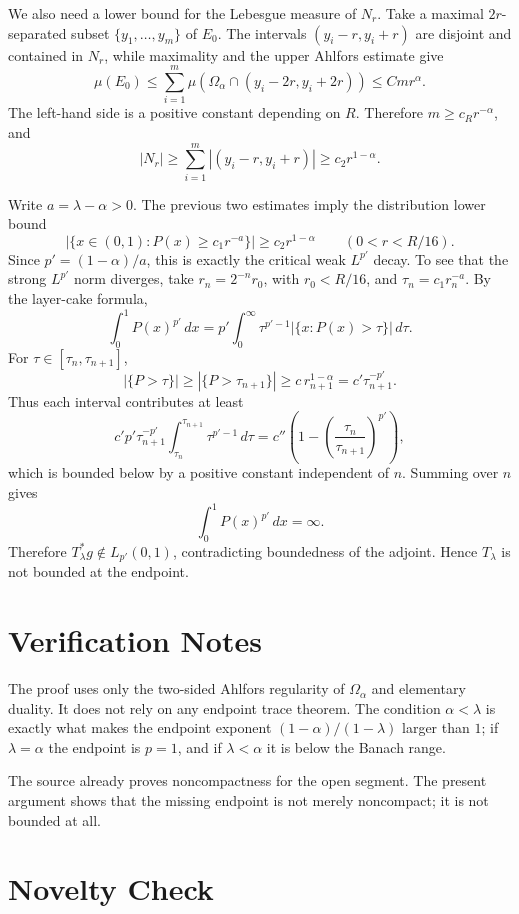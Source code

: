\documentclass[11pt]{article}
\begin{document}
We also need a lower bound for the Lebesgue measure of \(N_r\). Take a maximal
\(2r\)-separated subset \(\{y_1,\dots,y_m\}\) of
\(E_0\). The intervals
\((y_i-r,y_i+r)\) are disjoint and contained in \(N_r\), while maximality and
the upper Ahlfors estimate give
\[
  \mu(E_0)
  \le \sum_{i=1}^m \mu(\Omega_\alpha\cap(y_i-2r,y_i+2r))
  \le C m r^\alpha .
\]
The left-hand side is a positive constant depending on \(R\). Therefore
\(m\ge c_R r^{-\alpha}\), and
\[
  |N_r|\ge \sum_{i=1}^m |(y_i-r,y_i+r)|
  \ge c_2 r^{1-\alpha}.
\]

Write \(a=\lambda-\alpha>0\). The previous two estimates imply the distribution
lower bound
\[
  \big|\{x\in(0,1):P(x)\ge c_1 r^{-a}\}\big|
  \ge c_2 r^{1-\alpha}
  \qquad (0<r<R/16).
\]
Since \(p'=(1-\alpha)/a\), this is exactly the critical weak \(L^{p'}\) decay.
To see that the strong \(L^{p'}\) norm diverges, take \(r_n=2^{-n}r_0\), with
\(r_0<R/16\), and \(\tau_n=c_1 r_n^{-a}\). By the layer-cake formula,
\[
  \int_0^1 P(x)^{p'}\,dx
  =
  p'\int_0^\infty \tau^{p'-1}
  |\{x:P(x)>\tau\}|\,d\tau .
\]
For \(\tau\in[\tau_n,\tau_{n+1}]\),
\[
  |\{P>\tau\}|\ge |\{P>\tau_{n+1}\}|
  \ge c\,r_{n+1}^{1-\alpha}
  = c'\tau_{n+1}^{-p'}.
\]
Thus each interval contributes at least
\[
  c'p'\tau_{n+1}^{-p'}\int_{\tau_n}^{\tau_{n+1}}\tau^{p'-1}\,d\tau
  =
  c''\left(1-\left(\frac{\tau_n}{\tau_{n+1}}\right)^{p'}\right),
\]
which is bounded below by a positive constant independent of \(n\). Summing over
\(n\) gives
\[
  \int_0^1 P(x)^{p'}\,dx=\infty.
\]
Therefore \(T_\lambda^*g\notin L_{p'}(0,1)\), contradicting boundedness of the
adjoint. Hence \(T_\lambda\) is not bounded at the endpoint.

\section*{Verification Notes}

The proof uses only the two-sided Ahlfors regularity of \(\Omega_\alpha\) and
elementary duality. It does not rely on any endpoint trace theorem. The condition
\(\alpha<\lambda\) is exactly what makes the endpoint exponent
\((1-\alpha)/(1-\lambda)\) larger than \(1\); if \(\lambda=\alpha\) the endpoint
is \(p=1\), and if \(\lambda<\alpha\) it is below the Banach range.

The source already proves noncompactness for the open segment. The present
argument shows that the missing endpoint is not merely noncompact; it is not
bounded at all.

\section*{Novelty Check}
\end{document}
